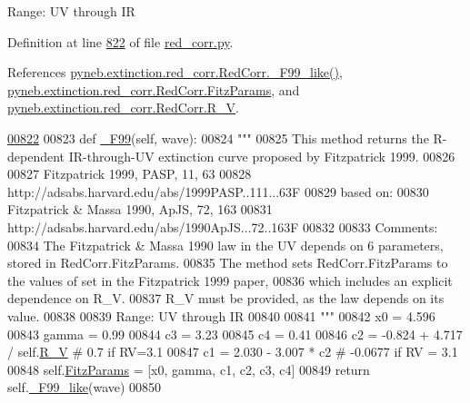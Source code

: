 \begin{DoxyVerb}
\begin{DoxyVerb}
Range: UV through IR\end{DoxyVerb}
 

Definition at line \hyperlink{red__corr_8py_source_l00822}{822} of file \hyperlink{red__corr_8py_source}{red\-\_\-corr.\-py}.



References \hyperlink{red__corr_8py_source_l00658}{pyneb.\-extinction.\-red\-\_\-corr.\-Red\-Corr.\-\_\-\-F99\-\_\-like()}, \hyperlink{red__corr_8py_source_l00078}{pyneb.\-extinction.\-red\-\_\-corr.\-Red\-Corr.\-Fitz\-Params}, and \hyperlink{red__corr_8py_source_l00204}{pyneb.\-extinction.\-red\-\_\-corr.\-Red\-Corr.\-R\-\_\-\-V}.


\begin{DoxyCode}
\hypertarget{classpyneb_1_1extinction_1_1red__corr_1_1_red_corr_l00822}{}\hyperlink{classpyneb_1_1extinction_1_1red__corr_1_1_red_corr_a8e249217925175868e6890e2e733c56a}{00822} 
00823     \textcolor{keyword}{def }\hyperlink{classpyneb_1_1extinction_1_1red__corr_1_1_red_corr_a8e249217925175868e6890e2e733c56a}{\_F99}(self, wave):
00824         \textcolor{stringliteral}{"""}
00825 \textcolor{stringliteral}{        This method returns the R-dependent IR-through-UV extinction curve proposed by Fitzpatrick 1999.}
00826 \textcolor{stringliteral}{}
00827 \textcolor{stringliteral}{        Fitzpatrick 1999, PASP, 11, 63}
00828 \textcolor{stringliteral}{        http://adsabs.harvard.edu/abs/1999PASP..111...63F}
00829 \textcolor{stringliteral}{        based on: }
00830 \textcolor{stringliteral}{        Fitzpatrick & Massa 1990, ApJS, 72, 163}
00831 \textcolor{stringliteral}{        http://adsabs.harvard.edu/abs/1990ApJS...72..163F}
00832 \textcolor{stringliteral}{        }
00833 \textcolor{stringliteral}{        Comments:}
00834 \textcolor{stringliteral}{        The Fitzpatrick & Massa 1990 law in the UV depends on 6 parameters, stored in RedCorr.FitzParams.}
00835 \textcolor{stringliteral}{        The method sets RedCorr.FitzParams to the values of set in the Fitzpatrick 1999 paper, }
00836 \textcolor{stringliteral}{        which includes an explicit dependence on R\_V.}
00837 \textcolor{stringliteral}{        R\_V must be provided, as the law depends on its value.}
00838 \textcolor{stringliteral}{        }
00839 \textcolor{stringliteral}{        Range: UV through IR}
00840 \textcolor{stringliteral}{}
00841 \textcolor{stringliteral}{        """}
00842         x0 = 4.596  
00843         gamma = 0.99    
00844         c3 = 3.23    
00845         c4 = 0.41    
00846         c2 = -0.824 + 4.717 / self.\hyperlink{classpyneb_1_1extinction_1_1red__corr_1_1_red_corr_a4696ecdd84c912c20e6aa19b1573e875}{R\_V} \textcolor{comment}{# 0.7 if RV=3.1}
00847         c1 = 2.030 - 3.007 * c2 \textcolor{comment}{# -0.0677 if RV = 3.1}
00848         self.\hyperlink{classpyneb_1_1extinction_1_1red__corr_1_1_red_corr_a133fcc7513d358e629266b24cbe7bebc}{FitzParams} = [x0, gamma, c1, c2, c3, c4]
00849         \textcolor{keywordflow}{return} self.\hyperlink{classpyneb_1_1extinction_1_1red__corr_1_1_red_corr_a8eb0fe7f840c32a87adfcf7ddd98a095}{\_F99\_like}(wave)
00850 


\end{DoxyCode}
\end{DoxyVerb}
